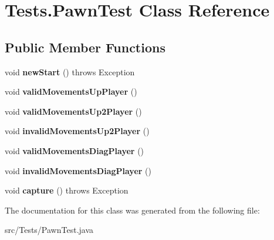 \hypertarget{class_tests_1_1_pawn_test}{}\section{Tests.\+Pawn\+Test Class Reference}
\label{class_tests_1_1_pawn_test}
\subsection*{Public Member Functions}
\begin{DoxyCompactItemize}
\item 
\mbox{\label{class_tests_1_1_pawn_test_a8109849a1e688f09410757cdd3b91b61}} 
void {\bfseries new\+Start} ()  throws Exception
\item 
\mbox{\label{class_tests_1_1_pawn_test_a1318533de69d55e17ece4a81c16ae328}} 
void {\bfseries valid\+Movements\+Up\+Player} ()
\item 
\mbox{\label{class_tests_1_1_pawn_test_a1747639f2fa30b99d2605a1baa394327}} 
void {\bfseries valid\+Movements\+Up2\+Player} ()
\item 
\mbox{\label{class_tests_1_1_pawn_test_a3b54ca0d5d5c7b9e532005f3f37233a7}} 
void {\bfseries invalid\+Movements\+Up2\+Player} ()
\item 
\mbox{\label{class_tests_1_1_pawn_test_a5efb08a6a46fc44d12eec3e6d26921ff}} 
void {\bfseries valid\+Movements\+Diag\+Player} ()
\item 
\mbox{\label{class_tests_1_1_pawn_test_ae382c81c1ff7a613223e4a3578fb2306}} 
void {\bfseries invalid\+Movements\+Diag\+Player} ()
\item 
\mbox{\label{class_tests_1_1_pawn_test_a0a398b4aeba3ba21b6e4db502f0728f3}} 
void {\bfseries capture} ()  throws Exception 
\end{DoxyCompactItemize}


The documentation for this class was generated from the following file\+:\begin{DoxyCompactItemize}
\item 
src/\+Tests/Pawn\+Test.\+java\end{DoxyCompactItemize}
